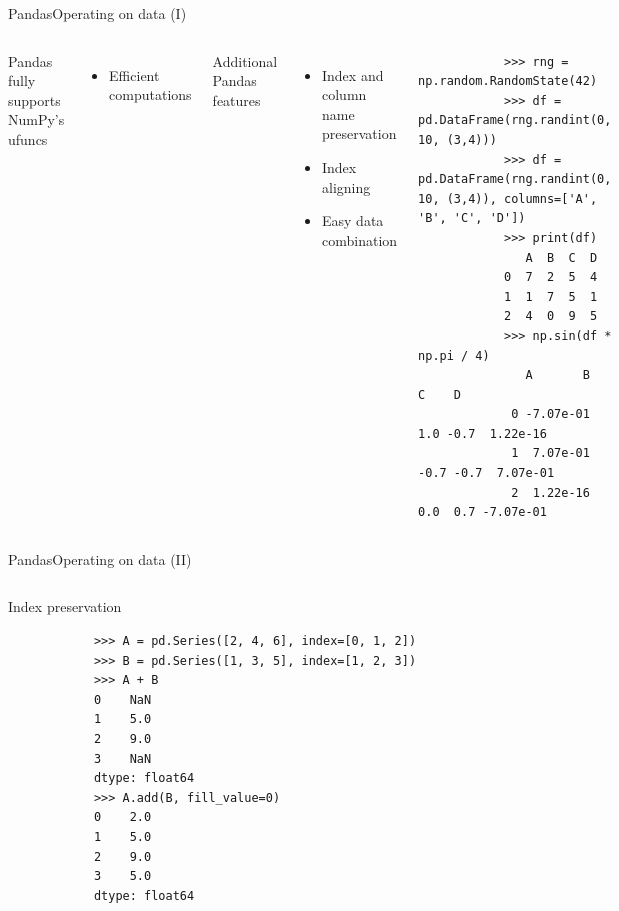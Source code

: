 \documentclass[10pt,compress]{beamer} %
\begin{document}
\begin{frame}[fragile]{Pandas}{Operating on data (I)}
	\begin{columns}
		Pandas fully supports NumPy's ufuncs
		\begin{itemize}
			\item Efficient computations
		\end{itemize}
		Additional Pandas features
		\begin{itemize}
			\item Index and column name preservation
			\item Index aligning
			\item Easy data combination
		\end{itemize}

		\begin{exampleblock}{}
		\vspace{-0.2cm} 
			\begin{lstlisting}
			>>> rng = np.random.RandomState(42)
			>>> df = pd.DataFrame(rng.randint(0, 10, (3,4)))
			>>> df = pd.DataFrame(rng.randint(0, 10, (3,4)), columns=['A', 'B', 'C', 'D'])
			>>> print(df)
			   A  B  C  D
			0  7  2  5  4
			1  1  7  5  1
			2  4  0  9  5
			>>> np.sin(df * np.pi / 4)
		       A       B    C    D
			 0 -7.07e-01  1.0 -0.7  1.22e-16
			 1  7.07e-01 -0.7 -0.7  7.07e-01
			 2  1.22e-16  0.0  0.7 -7.07e-01
			\end{lstlisting}
			\vspace{-0.2cm} 
		\end{exampleblock}
	\end{columns}
\end{frame}

\begin{frame}[fragile]{Pandas}{Operating on data (II)}
	\begin{columns}
 	   \column{0.8\textwidth}
		\begin{exampleblock}{Index preservation}
		\vspace{-0.2cm} 
			\begin{lstlisting}
			>>> A = pd.Series([2, 4, 6], index=[0, 1, 2])
			>>> B = pd.Series([1, 3, 5], index=[1, 2, 3])
			>>> A + B
			0    NaN
			1    5.0
			2    9.0
			3    NaN
			dtype: float64
			>>> A.add(B, fill_value=0)
			0    2.0
			1    5.0
			2    9.0
			3    5.0
			dtype: float64
			\end{lstlisting}
			\vspace{-0.2cm} 
		\end{exampleblock}
	\end{columns}
\end{frame}
\end{document}
